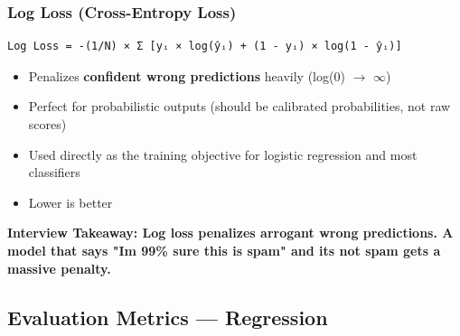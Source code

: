 \documentclass[11pt]{article}
\providecommand{\tightlist}{\setlength{\itemsep}{1pt}\setlength{\parskip}{0pt}}
\begin{document}
\subsubsection{Log Loss (Cross-Entropy Loss)}\label{log-loss-cross-entropy-loss}

\setcodelang{}

\begin{verbatim}
Log Loss = -(1/N) × Σ [yᵢ × log(ŷᵢ) + (1 - yᵢ) × log(1 - ŷᵢ)]
\end{verbatim}

\begin{itemize}
\tightlist
\item
  Penalizes \textbf{confident wrong predictions} heavily (log(0) \(\rightarrow\) \(\infty\))
\item
  Perfect for probabilistic outputs (should be calibrated probabilities, not raw scores)
\item
  Used directly as the training objective for logistic regression and most classifiers
\item
  Lower is better
\end{itemize}

\textbf{Interview Takeaway: Log loss penalizes arrogant wrong predictions. A model that says "I\textquotesingle m 99\% sure this is spam" and it\textquotesingle s not spam gets a massive penalty.}

\subsection{Evaluation Metrics --- Regression}\label{evaluation-metrics--regression}
\end{document}

